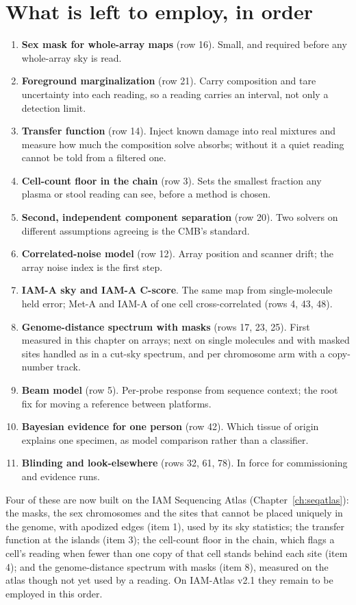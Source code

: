 \section{What is left to employ, in order}

\begin{enumerate}
\item \textbf{Sex mask for whole-array maps} (row 16). Small, and required before any whole-array sky is read.
\item \textbf{Foreground marginalization} (row 21). Carry composition and tare uncertainty into each reading, so a reading carries an interval,
not only a detection limit.
\item \textbf{Transfer function} (row 14). Inject known damage into real mixtures and measure how much the composition solve absorbs; without it
a quiet reading cannot be told from a filtered one.
\item \textbf{Cell-count floor in the chain} (row 3). Sets the smallest fraction any plasma or stool reading can see, before a method is chosen.
\item \textbf{Second, independent component separation} (row 20). Two solvers on different assumptions agreeing is the CMB's standard.
\item \textbf{Correlated-noise model} (row 12). Array position and scanner drift; the array noise index is the first step.
\item \textbf{IAM-A sky and IAM-A C-score}. The same map from single-molecule held error; Met-A and IAM-A of one cell cross-correlated (rows 4,
43, 48).
\item \textbf{Genome-distance spectrum with masks} (rows 17, 23, 25). First measured in this chapter on arrays; next on single molecules and
with masked sites handled as in a cut-sky spectrum, and per chromosome arm with a copy-number track.
\item \textbf{Beam model} (row 5). Per-probe response from sequence context; the root fix for moving a reference between platforms.
\item \textbf{Bayesian evidence for one person} (row 42). Which tissue of origin explains one specimen, as model comparison rather than a
classifier.
\item \textbf{Blinding and look-elsewhere} (rows 32, 61, 78). In force for commissioning and evidence runs.
\end{enumerate}

\noindent Four of these are now built on the IAM Sequencing Atlas (Chapter~\ref{ch:seqatlas}): the masks, the sex chromosomes and the
sites that cannot be placed uniquely in the genome, with apodized edges (item 1), used by its sky statistics; the transfer function at the
islands (item 3); the cell-count floor in the chain, which flags a cell's reading when fewer than one copy of that cell stands behind each
site (item 4); and the genome-distance spectrum with masks (item 8), measured on the atlas though not yet used by a reading. On IAM-Atlas
v2.1 they remain to be employed in this order.

